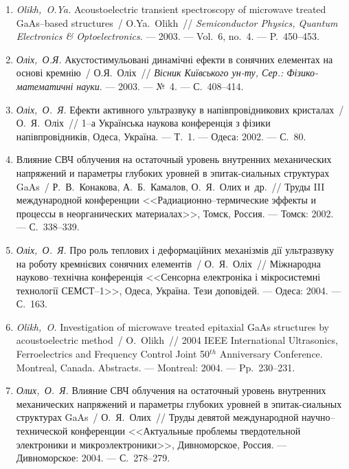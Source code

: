 \begin{enumerate}[label=\arabic*.,leftmargin=1cm,itemindent=0cm]
\item 
\emph{Olikh,~O.Ya.} Acoustoelectric transient spectroscopy of microwave
  treated {G}a{A}s--based structures~/ O.Ya.~Olikh~// \emph{Semiconductor
  Physics, Quantum Electronics \& Optoelectronics}. ---
  2003. ---
  Vol.~6, no.~4. ---
  P.~450--453.

\item 
\emph{Оліх,~О.Я.} Акустостимульовані
  динамічні ефекти в сонячних елементах на
  основі кремнію~/ О.Я.~Оліх~// \emph{Вісник
  Київського ун-ту, Сер.: Фізико-математичні
  науки}. ---
  2003. ---
  {№}~4. ---
  {С.}~408--414.


\item
\emph{Оліх,~О.~Я.} Ефекти активного
  ультразвуку в напівпровідникових
  кристалах~/ О.~Я.~Оліх~// 1--а {У}країнська
  наукова конференція з фізики
  напівпровідників, {О}деса, {У}країна. ---
  Т.~1. ---
  Одеса: 2002. ---
  {С.}~80.

\item
Влияние {СВЧ} облучения на остаточный
  уровень внутренних механических
  напряжений и параметры глубоких уровней в
  эпитак-сиальных структурах {G}a{A}s~/
  Р.~В.~Конакова, А.~Б.~Камалов, О.~Я.~Олих
  {и~др.}~// Труды {III} международной
  конференции <<{Р}адиационно--термические
  эффекты и процессы в неорганических
  материалах>>, {Т}омск, {Р}оссия. ---
  Томск: 2002. ---
  {С.}~338--339.

\item
\emph{Оліх,~О.~Я.} Про роль теплових і
  деформаційних механізмів дії ультразвуку
  на роботу кремнієвих сонячних елементів~/
  О.~Я.~Оліх~// Міжнародна науково--технічна
  конференція <<{С}енсорна електроніка і
  мікросистемні технології {СЕМСТ}--1>>,
  {О}деса, {У}країна. Тези доповідей. ---
  Одеса: 2004. ---
  {С.}~163.

\item
\emph{Olikh,~O.} Investigation of microwave treated epitaxial {G}a{A}s
  structures by acoustoelectric method~/ O.~Olikh~// 2004 {IEEE}
  {I}nternational {U}ltrasonics, {F}erroelectrics and {F}requency {C}ontrol
  {J}oint 50$^{th}$ {A}nniversary {C}onference. Montreal, {C}anada. Abstracts.
  ---
  Montreal: 2004. ---
  Pp.~230--231.

\item
\emph{Олих,~О.~Я.} Влияние {СВЧ} облучения на
  остаточный уровень внутренних
  механических напряжений и параметры
  глубоких уровней в эпитак-сиальных
  структурах {G}a{A}s~/ О.~Я.~Олих~// Труды девятой
  международной научно--технической
  конференции <<{А}ктуальные проблемы
  твердотельной электроники и
  микроэлектроники>>, {Д}ивноморское,
  {Р}оссия. ---
  Дивноморское: 2004. ---
  {С.}~278--279.


\end{enumerate}
